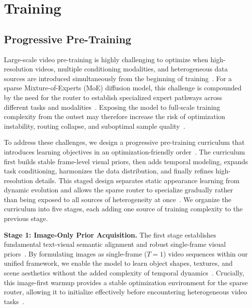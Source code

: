 \section{Training} \label{sec:training}

\subsection{Progressive Pre-Training}
Large-scale video pre-training is highly challenging to optimize when high-resolution videos, multiple conditioning modalities, and heterogeneous data sources are introduced simultaneously from the beginning of training~\cite{ho2022imagen,blattmann2023stable,wan2025wan}. For a sparse Mixture-of-Experts (MoE) diffusion model, this challenge is compounded by the need for the router to establish specialized expert pathways across different tasks and modalities~\cite{shazeer2017moe,switchtransformer,dai2024deepseekmoe}. Exposing the model to full-scale training complexity from the outset may therefore increase the risk of optimization instability, routing collapse, and suboptimal sample quality~\cite{switchtransformer,park2024switch}.

To address these challenges, we design a progressive pre-training curriculum that introduces learning objectives in an optimization-friendly order~\cite{ho2022imagen,blattmann2023stable}. The curriculum first builds stable frame-level visual priors, then adds temporal modeling, expands task conditioning, harmonizes the data distribution, and finally refines high-resolution details. This staged design separates static appearance learning from dynamic evolution and allows the sparse router to specialize gradually rather than being exposed to all sources of heterogeneity at once~\cite{singer2022make,guo2023animatediff}. We organize the curriculum into five stages, each adding one source of training complexity to the previous stage.

\noindent\textbf{Stage 1: Image-Only Prior Acquisition.}
The first stage establishes fundamental text-visual semantic alignment and robust single-frame visual priors~\cite{chen2023pixart,esser2024scaling}. By formulating images as single-frame ($T=1$) video sequences within our unified framework, we enable the model to learn object shapes, textures, and scene aesthetics without the added complexity of temporal dynamics~\cite{singer2022make,guo2023animatediff}. Crucially, this image-first warmup provides a stable optimization environment for the sparse router, allowing it to initialize effectively before encountering heterogeneous video tasks~\cite{switchtransformer,dai2024deepseekmoe}.


